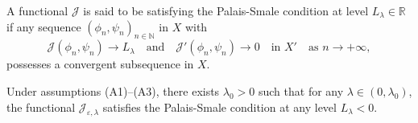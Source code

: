 \documentclass[reqno]{amsart}
\begin{document}
\begin{definition} \rm
A functional $\mathcal{J}$ is said to be satisfying the Palais-Smale condition at 
level $L_\lambda\in \mathbb{R}$ if any sequence $(\phi_n,\psi_n)_{n\in\mathbb{N}}$ in 
$X$ with
\[
\mathcal{J}(\phi_n,\psi_n)\to L_\lambda\quad \text{and}\quad
\mathcal{J}'(\phi_n,\psi_n)\to 0\quad \text{in }  X'\quad \text{as } n\to +\infty,
\]
possesses a convergent subsequence in $X$.
\end{definition}

\begin{lemma}\label{lemma1} 
Under assumptions {\rm (A1)--(A3)}, there exists $\lambda_0>0$ such that for any 
$\lambda\in (0,\lambda_0)$, the functional $\mathcal{J}_{\varepsilon,\lambda}$ 
satisfies the Palais-Smale condition at any level $L_\lambda<0$.
\end{lemma}
\end{document}
